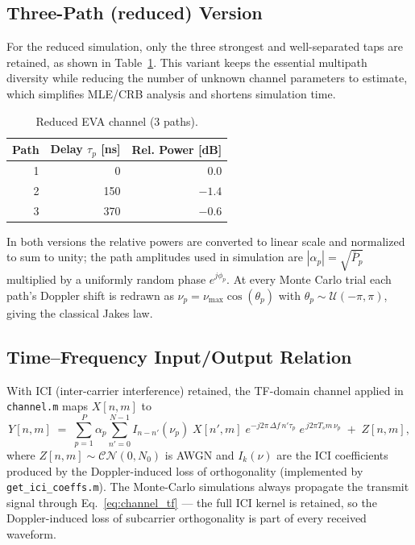 \documentclass[11pt,a4paper]{article}
\newcommand{\deltaf}{\Delta f}
\newcommand{\CN}{\mathcal{CN}}
\begin{document}
\subsection{Three-Path (reduced) Version}

For the reduced simulation, only the three strongest and well-separated
taps are retained, as shown in Table~\ref{tab:eva3}. This variant keeps
the essential multipath diversity while reducing the number of unknown
channel parameters to estimate, which simplifies MLE/CRB analysis and
shortens simulation time.

\begin{table}[h]
\centering
\caption{Reduced EVA channel (3 paths).}
\label{tab:eva3}
\begin{tabular}{rrr}
\toprule
Path & Delay $\tau_p$ [ns] & Rel. Power [dB] \\
\midrule
1 & 0   &  0.0 \\
2 & 150 & $-1.4$ \\
3 & 370 & $-0.6$ \\
\bottomrule
\end{tabular}
\end{table}

In both versions the relative powers are converted to linear scale and
normalized to sum to unity; the path amplitudes used in simulation are
$|\alpha_p| = \sqrt{\bar P_p}$ multiplied by a uniformly random phase
$e^{j\phi_p}$. At every Monte Carlo trial each path's Doppler shift is
redrawn as $\nu_p = \nu_{\max}\cos(\theta_p)$ with
$\theta_p \sim \mathcal{U}(-\pi,\pi)$, giving the classical Jakes law.

\subsection{Time--Frequency Input/Output Relation}

With ICI (inter-carrier interference) retained, the TF-domain channel
applied in \texttt{channel.m} maps $X[n,m]$ to
\begin{equation}
  Y[n,m] \;=\; \sum_{p=1}^{P}\alpha_p
  \sum_{n'=0}^{N-1}
  I_{n-n'}(\nu_p)\;
  X[n',m]\;
  e^{-j2\pi\,\deltaf\,n'\tau_p}\;
  e^{\,j2\pi T_s m\,\nu_p}
  \;+\; Z[n,m],
  \label{eq:channel_tf}
\end{equation}
where $Z[n,m]\sim\CN(0,N_0)$ is AWGN and $I_k(\nu)$ are the ICI
coefficients produced by the Doppler-induced loss of orthogonality
(implemented by \texttt{get\_ici\_coeffs.m}). The Monte-Carlo
simulations always propagate the transmit signal through
Eq.~\eqref{eq:channel_tf} — the full ICI kernel is retained, so the
Doppler-induced loss of subcarrier orthogonality is part of every
received waveform.
\end{document}
